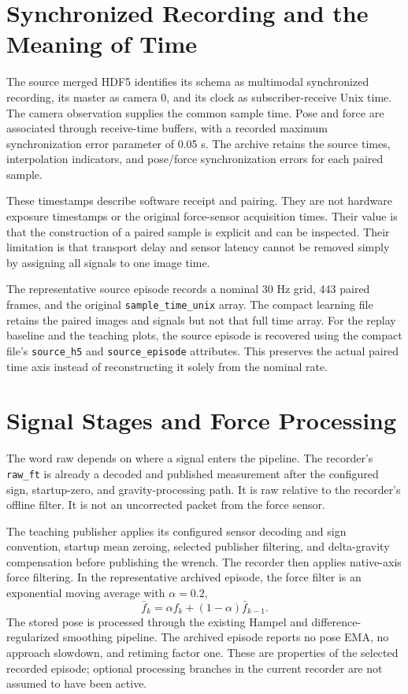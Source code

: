 \section{Synchronized Recording and the Meaning of Time}
The source merged HDF5 identifies its schema as multimodal synchronized recording, its master as camera 0, and its clock as subscriber-receive Unix time. The camera observation supplies the common sample time. Pose and force are associated through receive-time buffers, with a recorded maximum synchronization error parameter of 0.05 s. The archive retains the source times, interpolation indicators, and pose/force synchronization errors for each paired sample.

These timestamps describe software receipt and pairing. They are not hardware exposure timestamps or the original force-sensor acquisition times. Their value is that the construction of a paired sample is explicit and can be inspected. Their limitation is that transport delay and sensor latency cannot be removed simply by assigning all signals to one image time.

The representative source episode records a nominal 30 Hz grid, 443 paired frames, and the original \texttt{sample\_time\_unix} array. The compact learning file retains the paired images and signals but not that full time array. For the replay baseline and the teaching plots, the source episode is recovered using the compact file's \texttt{source\_h5} and \texttt{source\_episode} attributes. This preserves the actual paired time axis instead of reconstructing it solely from the nominal rate.

\section{Signal Stages and Force Processing}
The word raw depends on where a signal enters the pipeline. The recorder's \texttt{raw\_ft} is already a decoded and published measurement after the configured sign, startup-zero, and gravity-processing path. It is raw relative to the recorder's offline filter. It is not an uncorrected packet from the force sensor.

The teaching publisher applies its configured sensor decoding and sign convention, startup mean zeroing, selected publisher filtering, and delta-gravity compensation before publishing the wrench. The recorder then applies native-axis force filtering. In the representative archived episode, the force filter is an exponential moving average with \(\alpha=0.2\),
\begin{equation}
 \bar f_k=\alpha f_k+(1-\alpha)\bar f_{k-1}.
 \label{eq:force_ema}
\end{equation}
The stored pose is processed through the existing Hampel and difference-regularized smoothing pipeline. The archived episode reports no pose EMA, no approach slowdown, and retiming factor one. These are properties of the selected recorded episode; optional processing branches in the current recorder are not assumed to have been active.


